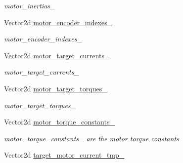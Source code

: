 \begin{DoxyCompactItemize}
\begin{DoxyCompactList}\small\item\em motor\+\_\+inertias\+\_\+ \end{DoxyCompactList}\item 
Vector2d \hyperlink{classblmc__robots_1_1SingleLeg_a8ac67df4a61c02ca927bbcab5c4bab0b}{motor\+\_\+encoder\+\_\+indexes\+\_\+}\hypertarget{classblmc__robots_1_1SingleLeg_a8ac67df4a61c02ca927bbcab5c4bab0b}{}\label{classblmc__robots_1_1SingleLeg_a8ac67df4a61c02ca927bbcab5c4bab0b}

\begin{DoxyCompactList}\small\item\em motor\+\_\+encoder\+\_\+indexes\+\_\+ \end{DoxyCompactList}\item 
Vector2d \hyperlink{classblmc__robots_1_1SingleLeg_a1727423baf1d924c5c38b5da82760daa}{motor\+\_\+target\+\_\+currents\+\_\+}\hypertarget{classblmc__robots_1_1SingleLeg_a1727423baf1d924c5c38b5da82760daa}{}\label{classblmc__robots_1_1SingleLeg_a1727423baf1d924c5c38b5da82760daa}

\begin{DoxyCompactList}\small\item\em motor\+\_\+target\+\_\+currents\+\_\+ \end{DoxyCompactList}\item 
Vector2d \hyperlink{classblmc__robots_1_1SingleLeg_a877ea486d60de86dda6f2f584483cd63}{motor\+\_\+target\+\_\+torques\+\_\+}\hypertarget{classblmc__robots_1_1SingleLeg_a877ea486d60de86dda6f2f584483cd63}{}\label{classblmc__robots_1_1SingleLeg_a877ea486d60de86dda6f2f584483cd63}

\begin{DoxyCompactList}\small\item\em motor\+\_\+target\+\_\+torques\+\_\+ \end{DoxyCompactList}\item 
Vector2d \hyperlink{classblmc__robots_1_1SingleLeg_acc9db4fea29151b45841b63a75d6cb18}{motor\+\_\+torque\+\_\+constants\+\_\+}\hypertarget{classblmc__robots_1_1SingleLeg_acc9db4fea29151b45841b63a75d6cb18}{}\label{classblmc__robots_1_1SingleLeg_acc9db4fea29151b45841b63a75d6cb18}

\begin{DoxyCompactList}\small\item\em motor\+\_\+torque\+\_\+constants\+\_\+ are the motor torque constants \end{DoxyCompactList}\item 
Vector2d \hyperlink{classblmc__robots_1_1SingleLeg_a5408963ab970855f3ab0c5fc0fb51803}{target\+\_\+motor\+\_\+current\+\_\+tmp\+\_\+}\hypertarget{classblmc__robots_1_1SingleLeg_a5408963ab970855f3ab0c5fc0fb51803}{}\label{classblmc__robots_1_1SingleLeg_a5408963ab970855f3ab0c5fc0fb51803}


\end{DoxyCompactItemize}
